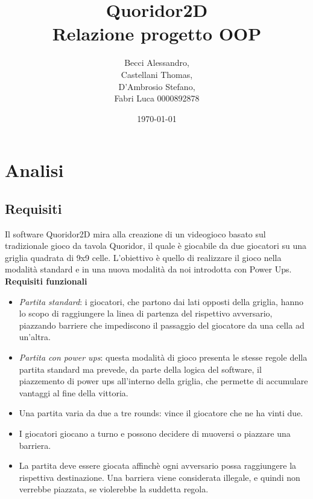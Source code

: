 \documentclass[a4paper,12pt]{report}
\begin{document}
	\title{\Huge \textbf{Quoridor2D} \\ \vspace{0.4cm} \large Relazione progetto OOP}
	\author{Becci Alessandro,\\
	Castellani Thomas, \\
	D'Ambrosio Stefano, \\
	Fabri Luca 0000892878}
	\date{\today}
	\maketitle 
	\newpage
	
	\tableofcontents{}
	\newpage
	
	\chapter{Analisi}

	\section{Requisiti}
	Il software Quoridor2D mira alla creazione di un videogioco basato sul tradizionale gioco da tavola Quoridor, il quale è giocabile da due giocatori su una griglia quadrata di 9x9 celle. L'obiettivo è quello di realizzare il gioco nella modalità standard e in una nuova modalità da noi introdotta con Power Ups.\\
	
	\textbf{Requisiti funzionali}
	\begin{itemize}
	\item \textit{Partita standard}: i giocatori, che partono dai lati opposti della griglia, hanno lo scopo di raggiungere la linea di partenza del rispettivo avversario, piazzando barriere che impediscono il passaggio del giocatore da una cella ad un'altra.
	\item \textit{Partita con power ups}: questa modalità di gioco presenta le stesse regole della partita standard ma prevede, da parte della logica del software, il piazzemento di power ups all'interno della griglia, che permette di accumulare vantaggi al fine della vittoria.
	\item Una partita varia da due a tre rounds: vince il giocatore che ne ha vinti due.
	\item I giocatori giocano a turno e possono decidere di muoversi o piazzare una barriera.
	\item La partita deve essere giocata affinchè ogni avversario possa raggiungere la rispettiva destinazione. Una barriera viene considerata illegale, e quindi non verrebbe piazzata, se violerebbe la suddetta regola. 
	\end{itemize}	
	
\end{document}

